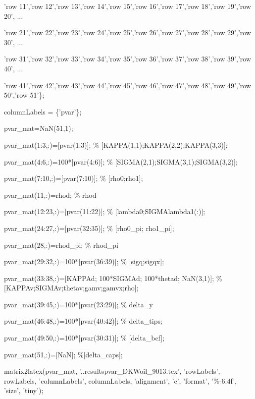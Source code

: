 \documentclass{article}
\begin{document}
'row 11','row 12','row 13','row 14','row 15','row 16','row 17','row 18','row
19','row 20', ...

'row 21','row 22','row 23','row 24','row 25','row 26','row 27','row 28','row
29','row 30', ...

'row 31','row 32','row 33','row 34','row 35','row 36','row 37','row 38','row
39','row 40', ...

'row 41','row 42','row 43','row 44','row 45','row 46','row 47','row 48','row
49','row 50','row 51'\};

columnLabels = \{'pvar'\};

pvar\_mat=NaN(51,1);

pvar\_mat(1:3,:)=[pvar(1:3)]; \% [KAPPA(1,1);KAPPA(2,2);KAPPA(3,3)];

pvar\_mat(4:6,:)=100*[pvar(4:6)]; \% [SIGMA(2,1);SIGMA(3,1);SIGMA(3,2)];

pvar\_mat(7:10,:)=[pvar(7:10)]; \% [rho0;rho1];

pvar\_mat(11,:)=rhod; \% rhod

pvar\_mat(12:23,:)=[pvar(11:22)]; \% [lambda0;SIGMAlambda1(:)];

pvar\_mat(24:27,:)=[pvar(32:35)]; \% [rho0\_pi; rho1\_pi];

pvar\_mat(28,:)=rhod\_pi; \% rhod\_pi

pvar\_mat(29:32,:)=100*[pvar(36:39)]; \% [sigq;sigqx];

pvar\_mat(33:38,:)=[KAPPAd; 100*SIGMAd; 100*thetad; NaN(3,1)]; \%
[KAPPAv;SIGMAv;thetav;gamv;gamvx;rho];

pvar\_mat(39:45,:)=100*[pvar(23:29)]; \% delta\_y

pvar\_mat(46:48,:)=100*[pvar(40:42)]; \% delta\_tips;

pvar\_mat(49:50,:)=100*[pvar(30:31)]; \% [delta\_bcf];

pvar\_mat(51,:)=[NaN]; \%[delta\_caps];

matrix2latex(pvar\_mat, '..\TEXTsymbol{\backslash}results\TEXTsymbol{%
\backslash}pvar\_DKWoil\_9013.tex', 'rowLabels', rowLabels, 'columnLabels',
columnLabels, 'alignment', 'c', 'format', '\%-6.4f', 'size', 'tiny');
\end{document}
